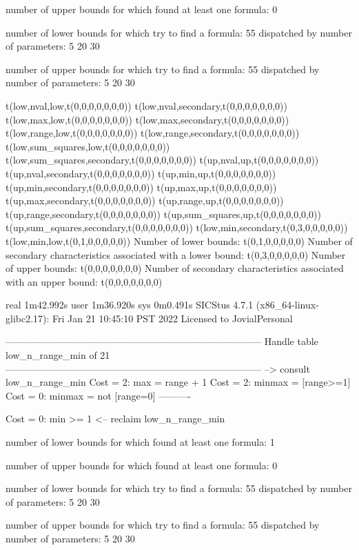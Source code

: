 number of upper bounds for which found at least one formula: 0

number of lower bounds for which try to find a formula: 55
dispatched by number of parameters: 5  20  30

number of upper bounds for which try to find a formula: 55
dispatched by number of parameters: 5  20  30

t(low,nval,low,t(0,0,0,0,0,0,0))
t(low,nval,secondary,t(0,0,0,0,0,0,0))
t(low,max,low,t(0,0,0,0,0,0,0))
t(low,max,secondary,t(0,0,0,0,0,0,0))
t(low,range,low,t(0,0,0,0,0,0,0))
t(low,range,secondary,t(0,0,0,0,0,0,0))
t(low,sum_squares,low,t(0,0,0,0,0,0,0))
t(low,sum_squares,secondary,t(0,0,0,0,0,0,0))
t(up,nval,up,t(0,0,0,0,0,0,0))
t(up,nval,secondary,t(0,0,0,0,0,0,0))
t(up,min,up,t(0,0,0,0,0,0,0))
t(up,min,secondary,t(0,0,0,0,0,0,0))
t(up,max,up,t(0,0,0,0,0,0,0))
t(up,max,secondary,t(0,0,0,0,0,0,0))
t(up,range,up,t(0,0,0,0,0,0,0))
t(up,range,secondary,t(0,0,0,0,0,0,0))
t(up,sum_squares,up,t(0,0,0,0,0,0,0))
t(up,sum_squares,secondary,t(0,0,0,0,0,0,0))
t(low,min,secondary,t(0,3,0,0,0,0,0))
t(low,min,low,t(0,1,0,0,0,0,0))
Number of lower bounds:                                             t(0,1,0,0,0,0,0)
Number of secondary characteristics associated with a lower bound:  t(0,3,0,0,0,0,0)
Number of upper bounds:                                             t(0,0,0,0,0,0,0)
Number of secondary characteristics associated with an upper bound: t(0,0,0,0,0,0,0)

real	1m42.992s
user	1m36.920s
sys	0m0.491s
SICStus 4.7.1 (x86_64-linux-glibc2.17): Fri Jan 21 10:45:10 PST 2022
Licensed to JovialPersonal


--------------------------------------------------------------------------------
Handle table low_n_range_min of 21
--------------------------------------------------------------------------------
--> consult low_n_range_min
Cost =  2:  max    = range + 1
Cost =  2:  minmax = [range>=1]
Cost =  0:  minmax = not [range=0]
----------

Cost =  0:  min >= 1
<-- reclaim low_n_range_min

number of lower bounds for which found at least one formula: 1

number of upper bounds for which found at least one formula: 0

number of lower bounds for which try to find a formula: 55
dispatched by number of parameters: 5  20  30

number of upper bounds for which try to find a formula: 55
dispatched by number of parameters: 5  20  30

